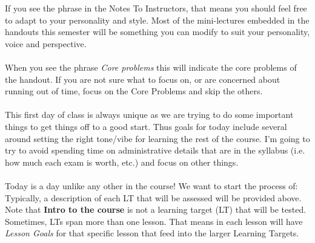 \documentclass[10pt]{article}
\begin{document}
\pagestyle{otherpages}
\thispagestyle{firstpage}



If you see the phrase \mod in the Notes To Instructors, that means you should feel free to adapt to your personality and style.  Most of the mini-lectures embedded in the handouts this semester will be something you can modify to suit your personality, voice and perspective.   \\\\
When you see the phrase {\em Core problems} this will indicate the core problems of the handout. If you are not sure what to focus on, or are concerned about running out of time, focus on the Core Problems and skip the others.\\\\
This first day of class is always unique as we are trying to do some important things to get things off to a good start. Thus goals for today include several around setting the right tone/vibe for learning the rest of the course. I'm going to try to avoid spending time on administrative details that are in the syllabus (i.e. how much each exam is worth, etc.) and focus on other things.\\\\
 Today is a day unlike any other in the course! We want to start the process of:
~\\
Typically, a description of each LT that will be assessed will be provided above.  Note that  {\bf Intro to the course}  is not a learning target (LT) that will be tested.  Sometimes, LTs span more than one lesson. That means in each lesson will have {\em Lesson Goals} for that specific lesson that feed into the larger Learning Targets.
\\\\
\end{document}
